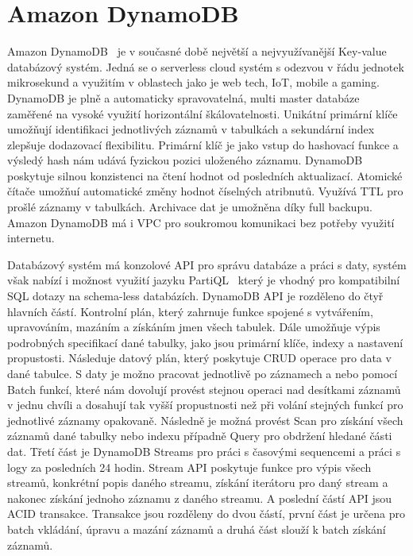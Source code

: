 \documentclass[czech,bachelor,dept460,male,csharp,cpdeclaration]{diploma}
\begin{document}
	\section{Amazon DynamoDB}
	
	Amazon DynamoDB~\cite{dynamodb} je v současné době největší a nejvyužívanější Key-value databázový systém. Jedná se o serverless cloud systém s odezvou v řádu jednotek mikrosekund a využitím v oblastech jako je web tech, IoT, mobile a gaming. DynamoDB je plně a automaticky spravovatelná, multi master databáze zaměřené na vysoké využití horizontální škálovatelnosti. Unikátní primární klíče umožňují identifikaci jednotlivých záznamů v tabulkách a sekundární index zlepšuje dodazovací flexibilitu. Primární klíč je jako vstup do hashovací funkce a výsledý hash nám udává fyzickou pozici uloženého záznamu. DynamoDB poskytuje silnou konzistenci na čtení hodnot od posledních aktualizací. Atomické čítače umožňuí automatické změny hodnot číselných atribnutů. Využívá TTL pro prošlé záznamy v tabulkách. Archivace dat je umožněna díky full backupu. Amazon DynamoDB má i VPC pro soukromou komunikaci bez potřeby využití internetu.
	
	Databázový systém má konzolové API pro správu databáze a práci s daty, systém však nabízí i možnost využití jazyku PartiQL~\cite{partiql} který je vhodný pro kompatibilní SQL dotazy na schema-less databázích. DynamoDB API je rozděleno do čtyř hlavních částí. Kontrolní plán, který zahrnuje funkce spojené s vytvářením, upravováním, mazáním a získáním jmen všech tabulek. Dále umožňuje výpis podrobných specifikací dané tabulky, jako jsou primární klíče, indexy a nastavení propustosti. Následuje datový plán, který poskytuje CRUD operace pro data v dané tabulce. S daty je možno pracovat jednotlivě po záznamech a nebo pomocí Batch funkcí, které nám dovolují provést stejnou operaci nad desítkami záznamů v jednu chvíli a dosahují tak vyšší propustnosti než při volání stejných funkcí pro jednotlivé záznamy opakovaně. Následně je možná provést Scan pro získání všech záznamů dané tabulky nebo indexu případně Query pro obdržení hledané části dat. Třetí část je DynamoDB Streams pro práci s časovými sequencemi a práci s logy za posledních 24 hodin. Stream API poskytuje funkce pro výpis všech streamů, konkrétní popis daného streamu, získání iterátoru pro daný stream a nakonec získání jednoho záznamu z daného streamu. A poslední částí API jsou ACID transakce. Transakce jsou rozděleny do dvou částí, první část je určena pro batch vkládání, úpravu a mazání záznamů a druhá část slouží k batch získání záznamů.
		
\end{document}
